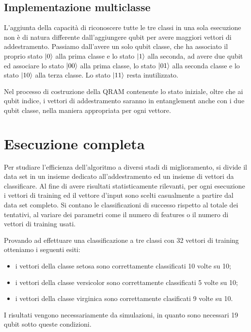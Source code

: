 \subsection{Implementazione multiclasse}

L'aggiunta della capacità di riconoscere tutte le tre classi in una sola esecuzione 
non è di natura differente dall'aggiungere qubit per avere maggiori vettori 
di addestramento. Passiamo dall'avere un solo qubit classe, che ha associato il 
proprio stato  
$\ket{0}$ alla prima classe e lo stato $\ket{1}$ alla seconda, ad avere due qubit 
ed associare lo stato $\ket{00}$ alla prima classe, lo stato $\ket{01}$ alla 
seconda classe e lo stato $\ket{10}$ alla terza classe. Lo stato $\ket{11}$ resta 
inutilizzato. 

Nel processo di costruzione della \ac{QRAM} contenente lo stato iniziale, 
oltre che ai qubit indice, i vettori di addestramento saranno in entanglement 
anche con i due qubit classe, nella maniera appropriata per ogni vettore. 

\section{Esecuzione completa}

Per studiare l'efficienza dell'algoritmo a diversi stadi di miglioramento, 
si divide il data set in un insieme dedicato all'addestramento ed un insieme 
di vettori da classificare. Al fine di avere risultati statisticamente 
rilevanti, per ogni esecuzione i vettori di training ed il vettore d'input 
sono scelti casualmente a partire dal data set completo. 
Si contano le classificazioni di successo 
rispetto al totale dei tentativi, al variare dei parametri come il numero 
di features o il numero di vettori di training usati. 

Provando ad effettuare una classificazione a tre classi con 32 vettori di 
training otteniamo i seguenti esiti: 
\begin{itemize}
    \item i vettori della classe setosa sono correttamente classificati 10 volte su 10;
    \item i vettori della classe versicolor sono correttamente classificati 5 volte su 10;
    \item i vettori della classe virginica sono correttamente clasificati 9 volte su 10.
\end{itemize}
I risultati vengono necessariamente da simulazioni, in quanto sono necessari 
19 qubit sotto queste condizioni. 
